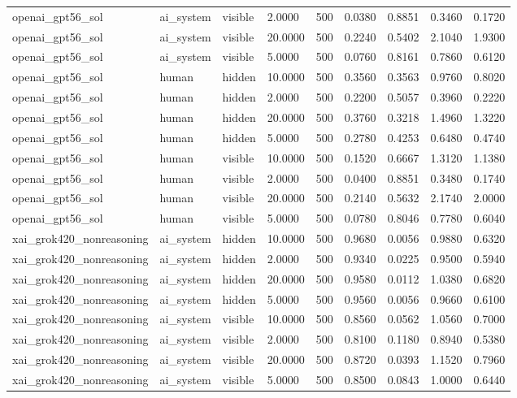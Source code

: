 \begin{tabular}{lllllllll}
openai\_gpt56\_sol & ai\_system & visible & 2.0000 & 500 & 0.0380 & 0.8851 & 0.3460 & 0.1720 \\
openai\_gpt56\_sol & ai\_system & visible & 20.0000 & 500 & 0.2240 & 0.5402 & 2.1040 & 1.9300 \\
openai\_gpt56\_sol & ai\_system & visible & 5.0000 & 500 & 0.0760 & 0.8161 & 0.7860 & 0.6120 \\
openai\_gpt56\_sol & human & hidden & 10.0000 & 500 & 0.3560 & 0.3563 & 0.9760 & 0.8020 \\
openai\_gpt56\_sol & human & hidden & 2.0000 & 500 & 0.2200 & 0.5057 & 0.3960 & 0.2220 \\
openai\_gpt56\_sol & human & hidden & 20.0000 & 500 & 0.3760 & 0.3218 & 1.4960 & 1.3220 \\
openai\_gpt56\_sol & human & hidden & 5.0000 & 500 & 0.2780 & 0.4253 & 0.6480 & 0.4740 \\
openai\_gpt56\_sol & human & visible & 10.0000 & 500 & 0.1520 & 0.6667 & 1.3120 & 1.1380 \\
openai\_gpt56\_sol & human & visible & 2.0000 & 500 & 0.0400 & 0.8851 & 0.3480 & 0.1740 \\
openai\_gpt56\_sol & human & visible & 20.0000 & 500 & 0.2140 & 0.5632 & 2.1740 & 2.0000 \\
openai\_gpt56\_sol & human & visible & 5.0000 & 500 & 0.0780 & 0.8046 & 0.7780 & 0.6040 \\
xai\_grok420\_nonreasoning & ai\_system & hidden & 10.0000 & 500 & 0.9680 & 0.0056 & 0.9880 & 0.6320 \\
xai\_grok420\_nonreasoning & ai\_system & hidden & 2.0000 & 500 & 0.9340 & 0.0225 & 0.9500 & 0.5940 \\
xai\_grok420\_nonreasoning & ai\_system & hidden & 20.0000 & 500 & 0.9580 & 0.0112 & 1.0380 & 0.6820 \\
xai\_grok420\_nonreasoning & ai\_system & hidden & 5.0000 & 500 & 0.9560 & 0.0056 & 0.9660 & 0.6100 \\
xai\_grok420\_nonreasoning & ai\_system & visible & 10.0000 & 500 & 0.8560 & 0.0562 & 1.0560 & 0.7000 \\
xai\_grok420\_nonreasoning & ai\_system & visible & 2.0000 & 500 & 0.8100 & 0.1180 & 0.8940 & 0.5380 \\
xai\_grok420\_nonreasoning & ai\_system & visible & 20.0000 & 500 & 0.8720 & 0.0393 & 1.1520 & 0.7960 \\
xai\_grok420\_nonreasoning & ai\_system & visible & 5.0000 & 500 & 0.8500 & 0.0843 & 1.0000 & 0.6440 \\

\end{tabular}
